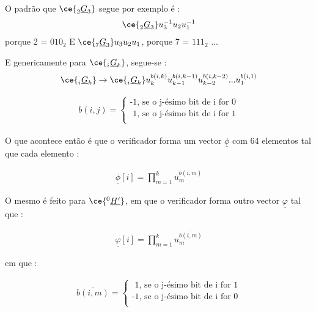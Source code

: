 O padrão que $\ce{^{\ }_{2}\underline{G}_{3}}$ segue por exemplo é :
\begin{align*}
\ce{^{\ }_{2}\underline{G}_{3}}u_{3}^{-1}u_{2}u_{1}^{-1}  
\end{align*}
\quad\quad\quad\quad\quad\quad\quad\quad\quad\quad\quad\quad\quad\quad porque 2 = $010_2$ \newline
E $\ce{^{\ }_{7}\underline{G}_{3}}u_{3}u_{2}u_{1}$,  porque 7 = $111_2$ ... \newline

E genericamente para $\ce{^{\ }_{i}\underline{G}_{k}}$, segue-se : \newline
\begin{align*}
\ce{^{\ }_{i}\underline{G}_{k}} \rightarrow \ce{^{\ }_{i}\underline{G}_{k}}u_{k}^{b(i,k)}u_{k-1}^{b(i,k-1)}u_{k-2}^{b(i,k-2)}...u_{1}^{b(i,1)}
\end{align*}

\begin{align*}
 b(i,j)=
 \begin{cases} 
      \text{-1, se o j-ésimo bit de i for 0} \\
      \text{ 1, se o j-ésimo bit de i for 1} \\
 \end{cases}
\end{align*}

O que acontece então é que o verificador forma um vector $\underline{\phi}$ com 64 elementos tal que cada elemento :

\begin{align*}
 \underline{\phi}[i]=\prod_{m=1}^{k} u_{m}^{b(i,m)}
\end{align*}

O mesmo é feito para $\ce{^{0}_{\ }\underline{H'}}$, em que o verificador forma outro vector $\underline{\varphi}$ tal que : 

\begin{align*}
 \underline{\varphi}[i]=\prod_{m=1}^{k} u_{m}^\overline{b(i,m)}
\end{align*}

em que :

\begin{align*}
 \overline{b(i,m)}=
 \begin{cases} 
      \text{ 1, se o j-ésimo bit de i for 1} \\
      \text{-1, se o j-ésimo bit de i for 0} \\
 \end{cases}
\end{align*}

